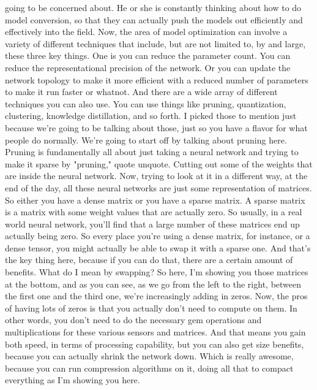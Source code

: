 {{{{{    going to be concerned about.
    He or she is constantly thinking about how
    to do model conversion, so that they can actually push the models out
    efficiently and effectively into the field.
    Now, the area of model optimization can involve
    a variety of different techniques that include, but are not limited to, by
    and large, these three key things.
    One is you can reduce the parameter count.
    You can reduce the representational precision of the network.
    Or you can update the network topology to make
    it more efficient with a reduced number of parameters to make it run faster
    or whatnot.
    And there are a wide array of different techniques you can also use.
    You can use things like pruning, quantization, clustering, knowledge
    distillation, and so forth.
    I picked those to mention just because we're going to be talking about those,
    just so you have a flavor for what people do normally.
    We're going to start off by talking about pruning here.
    Pruning is fundamentally all about just taking a neural network
    and trying to make it sparse by "pruning," quote unquote.
    Cutting out some of the weights that are inside the neural network.
    Now, trying to look at it in a different way, at the end of the day,
    all these neural networks are just some representation of matrices.
    So either you have a dense matrix or you have a sparse matrix.
    A sparse matrix is a matrix with some weight values that are actually zero.
    So usually, in a real world neural network,
    you'll find that a large number of these matrices end up actually being zero.
    So every place you're using a dense matrix, for instance,
    or a dense tensor, you might actually be able to swap it with a sparse one.
    And that's the key thing here, because if you can do that,
    there are a certain amount of benefits.
    What do I mean by swapping?
    So here, I'm showing you those matrices at the bottom,
    and as you can see, as we go from the left to the right,
    between the first one and the third one, we're increasingly adding in zeros.
    Now, the pros of having lots of zeros is that you actually
    don't need to compute on them.
    In other words, you don't need to do the necessary gem operations
    and multiplications for these various sensors and matrices.
    And that means you gain both speed, in terms of processing capability,
    but you can also get size benefits, because you can actually
    shrink the network down.
    Which is really awesome, because you can run compression algorithms on it,
    doing all that to compact everything as I'm showing you here.
}}}}}
